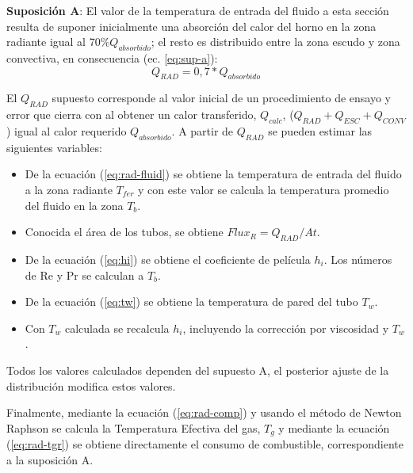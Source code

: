 \par \textbf{Suposición A}: El valor de la temperatura de entrada del fluido a esta sección resulta de suponer inicialmente una absorción del calor del horno en la zona radiante igual al 70\%$Q_{absorbido}$; el resto es distribuido entre la zona escudo y zona convectiva, en consecuencia (ec. \ref{eq:sup-a}):
\begin{equation}\label{eq:sup-a} Q_{RAD} = 0,7 * Q_{absorbido} \end{equation}
\par El $Q_{RAD}$ supuesto corresponde al valor inicial de un procedimiento de ensayo y error que cierra con al obtener un calor transferido, $Q_{calc}$, ($Q_{RAD} + Q_{ESC} + Q_{CONV}$) igual al calor requerido $Q_{absorbido}$. A partir de $Q_{RAD}$ se pueden estimar las siguientes variables:
\begin{itemize}
    \item De la ecuación (\ref{eq:rad-fluid}) se obtiene la temperatura de entrada del fluido a la zona radiante $T_{fer}$ y con este valor se calcula la temperatura promedio del fluido en la zona $T_b$.
    \item Conocida el área de los tubos, se obtiene $Flux_R = Q_{RAD} /At$.
    \item De la ecuación (\ref{eq:hi}) se obtiene el coeficiente de película $h_i$. Los números de Re y Pr se calculan a $T_b$.
    \item De la ecuación (\ref{eq:tw}) se obtiene la temperatura de pared del tubo $T_w$.
    \item Con $T_w$ calculada se recalcula $h_i$, incluyendo la corrección por viscosidad y $T_w$.
\end{itemize}
\par Todos los valores calculados dependen del supuesto A, el posterior ajuste de la distribución modifica estos valores.
\par Finalmente, mediante la ecuación (\ref{eq:rad-comp}) y usando el método de Newton Raphson se calcula la Temperatura Efectiva del gas, $T_g$ y mediante la ecuación (\ref{eq:rad-tgr}) se obtiene directamente el consumo de combustible, correspondiente a la suposición A.

